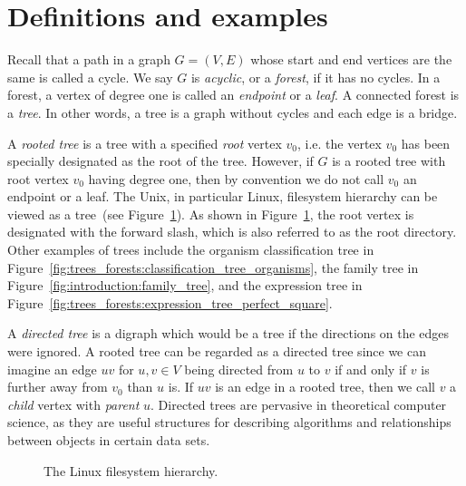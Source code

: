 \section{Definitions and examples}

Recall that a path in a graph $G = (V, E)$ whose start and end vertices
are the same is called a cycle. We say $G$ is
\emph{acyclic}, or a \emph{forest}, if it
has no cycles. In a forest, a vertex of degree one is called an
\emph{endpoint} or a \emph{leaf}. A
connected forest is a \emph{tree}. In other words, a tree
is a graph without cycles and each edge is a bridge.

A \emph{rooted tree} is a tree with a
specified \emph{root} vertex $v_0$, i.e. the vertex $v_0$
has been specially designated as the root of the tree. However, if $G$
is a rooted tree with root vertex $v_0$ having degree one, then by
convention we do not call $v_0$ an endpoint or a leaf. The
Unix, in particular Linux,
filesystem hierarchy can be viewed as a tree~(see
Figure~\ref{fig:trees_forests:filesystem_hierarchy}). As shown in
Figure~\ref{fig:trees_forests:filesystem_hierarchy}, the root
vertex is designated with the forward slash, which
is also referred to as the root
directory. Other examples of trees include the
organism classification tree in
Figure~\ref{fig:trees_forests:classification_tree_organisms}, the
family tree in
Figure~\ref{fig:introduction:family_tree}, and the
expression tree in
Figure~\ref{fig:trees_forests:expression_tree_perfect_square}.

A \emph{directed tree} is a digraph which would
be a tree if the directions on the edges were ignored. A rooted tree
can be regarded as a directed tree since we can imagine an edge $uv$
for $u,v \in V$ being directed from $u$ to $v$ if and only if $v$ is
further away from $v_0$ than $u$ is. If $uv$ is an edge in a rooted
tree, then we call $v$ a \emph{child} vertex with
\emph{parent} $u$. Directed trees are pervasive in
theoretical computer science, as they are useful structures for
describing algorithms and relationships between objects in certain
data sets.

\begin{figure}[!htbp]
\centering
{}

\caption{The Linux filesystem hierarchy.}
\label{fig:trees_forests:filesystem_hierarchy}
\end{figure}

